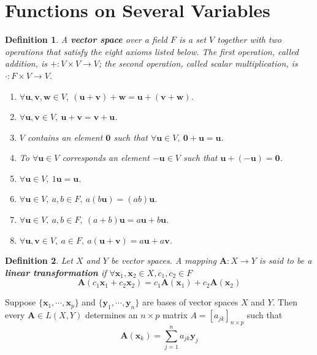 \documentclass[aps,pra,onecolumn,notitlepage,superscriptaddress]{revtex4-1}
\newcommand{\st}[1]{\mathbf{#1}}
\newtheorem{defi}{Definition}
\begin{document}
    \section{Functions on Several Variables}
    \begin{defi}
        A \textbf{vector space} over a field $F$ is a set $V$ together with two operations that satisfy the eight axioms listed below. The first operation, called addition, is $+ : V \times V \to V$; the second operation, called scalar multiplication, is $\cdot : F \times V \to V$.
        \begin{enumerate}
            \item $\forall \st{u,v,w} \in V, \ \st{(u+v)+w = u+(v+w)}$.
            \item $\forall \st{u,v} \in V, \ \st{u+v = v+u}$.
            \item $V$ contains an element $\st{0}$ such that $\forall \st{u} \in V, \ \st{0 + u = u}$.
            \item To $\forall \st{u} \in V$ corresponds an element $\st{-u} \in V$ such that $\st{u+(-u) = 0}$.
            \item $\forall \st{u} \in V, \ 1\st{u = u}$.
            \item $\forall \st{u} \in V, \ a,b \in F, \ a(b\st{u}) = (ab)\st{u}$.
            \item $\forall \st{u} \in V, \ a,b \in F, \ (a+b)\st{u} = a\st{u} + b\st{u}$.
            \item $\forall \st{u,v} \in V, \ a \in F, \ a\st{(u+v)} = a\st{u} + a\st{v}$.
        \end{enumerate}
    \end{defi}

    \begin{defi}
        Let $X$ and $Y$ be vector spaces. A mapping $\st{A}: X \to Y$ is said to be a \textbf{linear transformation} if $\forall \st{x}_1,\st{x}_2\in X, c_1,c_2\in F$
        \begin{equation}
            \st{A}(c_1\st{x}_1+c_2\st{x}_2) = c_1\st{A}(\st{x}_1) + c_2\st{A}(\st{x}_2)
        \end{equation}
    \end{defi}

        Suppose $\{ \st{x}_1,\cdots, \st{x}_p \}$ and $\{ \st{y}_1,\cdots, \st{y}_n \}$ are bases of vector spaces $X$ and $Y$. Then every $\st{A} \in L(X,Y)$ determines an $n \times p$ matrix $A = [a_{jk}]_{n \times p}$ such that
        \begin{equation}
            \st{A}(\st{x}_k) = \sum_{j=1}^n a_{jk}\st{y}_j
        \end{equation}
\end{document}
